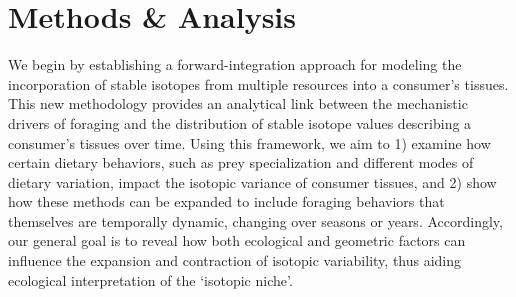 \documentclass{article}
\begin{document}
\section{Methods \& Analysis}
We begin by establishing a forward-integration approach for modeling the incorporation of stable isotopes from multiple resources into a consumer's tissues.
This new methodology provides an analytical link between the mechanistic drivers of foraging and the distribution of stable isotope values describing a consumer's tissues over time.
Using this framework, we aim to
1) examine how certain dietary behaviors, such as prey specialization and different modes of dietary variation, impact the isotopic variance of consumer tissues, and
2) show how these methods can be expanded to include foraging behaviors that themselves are temporally dynamic, changing over seasons or years.
Accordingly, our general goal is to reveal how both ecological and geometric factors can influence the expansion and contraction of isotopic variability, thus aiding ecological interpretation of the `isotopic niche'.
\end{document}
